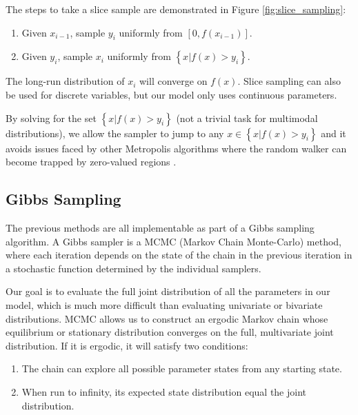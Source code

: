 \documentclass[a4paper, 12pt]{article}
\begin{document}
The steps to take a slice sample are demonstrated in Figure \ref{fig:slice_sampling}:

\begin{enumerate}
\item Given $x_{i-1}$, sample $y_i$ uniformly from $[0, f(x_{i-1})]$.
\item Given $y_i$, sample $x_i$ uniformly from $\left\{ x | f(x) > y_i \right\}$.
\end{enumerate}

The long-run distribution of $x_i$ will converge on $f(x)$. Slice sampling can also be used for discrete variables, but our model only uses continuous parameters.

By solving for the set $\left\{ x | f(x) > y_i \right\}$ (not a trivial task for multimodal distributions), we allow the sampler to jump to any $x\in \left\{ x | f(x) > y_i \right\}$ and it avoids issues faced by other Metropolis algorithms where the random walker can become trapped by zero-valued regions .

\subsection{Gibbs Sampling} \label{sec:gibbs}
The previous methods are all implementable as part of a Gibbs sampling algorithm. A Gibbs sampler is a MCMC (Markov Chain Monte-Carlo) method, where each iteration depends on the state of the chain in the previous iteration in a stochastic function determined by the individual samplers.

Our goal is to evaluate the full joint distribution of all the parameters in our model, which is much more difficult than evaluating univariate or bivariate distributions. MCMC allows us to construct an ergodic Markov chain whose equilibrium or stationary distribution converges on the full, multivariate joint distribution. If it is ergodic, it will satisfy two conditions:

\begin{enumerate}
\item The chain can explore all possible parameter states from any starting state.
\item When run to infinity, its expected state distribution equal the joint distribution.
\end{enumerate}
\end{document}

